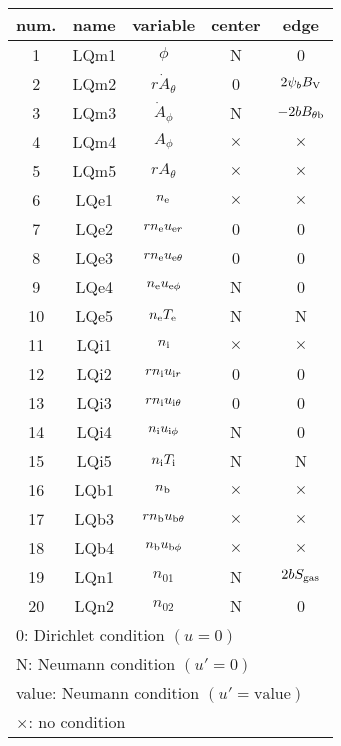 \documentclass[11pt]{article}
\def\r#1{{\rm#1}}
\def\ne{n_\r{e}}
\def\ni{n_\r{i}}
\def\nb{n_\r{b}}
\def\uer{u_{\r{e}r}}
\def\uir{u_{\r{i}r}}
\def\ueth{u_{\r{e}\theta}}
\def\uith{u_{\r{i}\theta}}
\def\ubth{u_{\r{b}\theta}}
\def\ueph{u_{\r{e}\phi}}
\def\uiph{u_{\r{i}\phi}}
\def\ubph{u_{\r{b}\phi}}
\def\Athd{\dot{A}_\theta}
\def\Aphd{\dot{A}_\phi}
\def\Ath{A_\theta}
\def\Aph{A_\phi}
\def\Te{T_\r{e}}
\def\Ti{T_\r{i}}
\def\nna{n_{01}}
\def\nnb{n_{02}}
\begin{document}
\begin{tabular}{|c|c|c|c|c|}\hline
 num. & name & variable      & center & edge \\\hline
 1    & LQm1 & $\phi$        & N        & 0\\
 2    & LQm2 & $r \Athd$     & 0        & $2\psi_b B_\r{V}$\\
 3    & LQm3 & $\Aphd$       & N        & $-2bB_{\theta\r{b}}$\\
 4    & LQm4 & $\Aph$        & $\times$ & $\times$\\
 5    & LQm5 & $r \Ath$      & $\times$ & $\times$\\
 6    & LQe1 & $\ne$         & $\times$ & $\times$\\
 7    & LQe2 & $r \ne \uer$  & 0        & 0\\
 8    & LQe3 & $r \ne \ueth$ & 0        & 0\\
 9    & LQe4 & $\ne \ueph$   & N        & 0\\
 10   & LQe5 & $\ne \Te$     & N        & N\\
 11   & LQi1 & $\ni$         & $\times$ & $\times$\\
 12   & LQi2 & $r \ni \uir$  & 0        & 0\\
 13   & LQi3 & $r \ni \uith$ & 0        & 0\\
 14   & LQi4 & $\ni \uiph$   & N        & 0\\
 15   & LQi5 & $\ni \Ti$     & N        & N\\
 16   & LQb1 & $\nb$         & $\times$ & $\times$\\
 17   & LQb3 & $r \nb \ubth$ & $\times$ & $\times$\\
 18   & LQb4 & $\nb \ubph$   & $\times$ & $\times$\\
 19   & LQn1 & $\nna$        & N        & $2bS_\r{gas}$\\
 20   & LQn2 & $\nnb$        & N        & 0\\\hline
 \multicolumn{5}{l}{0: Dirichlet condition $(u=0)$}\\
 \multicolumn{5}{l}{N: Neumann condition $(u'=0)$}\\
 \multicolumn{5}{l}{value: Neumann condition $(u'=\mbox{value})$}\\
 \multicolumn{5}{l}{$\times$: no condition}
\end{tabular}
\end{document}
